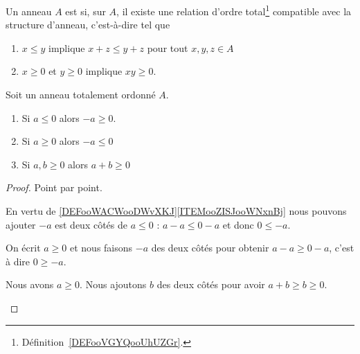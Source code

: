 \begin{definition}	\label{DEFooWACWooDWvXKJ}
	Un anneau \( A\) est  si, sur \( A \),  il existe une relation d'ordre total\footnote{Définition~\ref{DEFooVGYQooUhUZGr}.} compatible avec la structure d'anneau, c'est-à-dire tel que
	\begin{enumerate}
		\item       \label{ITEMooZISJooWNxnBj}
		      \( x\leq y\) implique \( x+z\leq y+z\) pour tout \( x,y,z\in A\)
		\item   \label{CONDooBYYDooElXgPO}
		      \( x\geq 0\) et \( y\geq 0\) implique \( xy\geq 0\).
	\end{enumerate}
\end{definition}


\begin{proposition}	\label{PROPooELXCooCYzEVD}
	Soit un anneau totalement ordonné \( A\).
	\begin{enumerate}
		\item   \label{ITEMooRRUGooRUpYwt}
		      Si \( a\leq 0\) alors \( -a\geq 0\).
		\item	\label{ITEMooNKYCooCmqHsO}
		      Si \( a\geq 0\) alors \( -a\leq 0\)
		\item	\label{ITEMooXOTGooYxKubR}
		      Si \( a,b\geq 0\) alors \( a+b\geq 0\)
	\end{enumerate}
\end{proposition}

\begin{proof}
	Point par point.
	\begin{subproof}
		En vertu de \ref{DEFooWACWooDWvXKJ}\ref{ITEMooZISJooWNxnBj} nous pouvons ajouter \( -a\) est deux côtés de \( a\leq 0\) : \( a-a\leq 0-a\) et donc \( 0\leq -a\).

		On écrit \( a\geq 0\) et nous faisons \( -a\) des deux côtés pour obtenir \( a-a\geq 0-a\), c'est à dire \( 0\geq -a\).

		Nous avons \( a\geq 0\). Nous ajoutons \( b\) des deux côtés pour avoir \( a+b\geq b\geq 0\).
	\end{subproof}
\end{proof}


